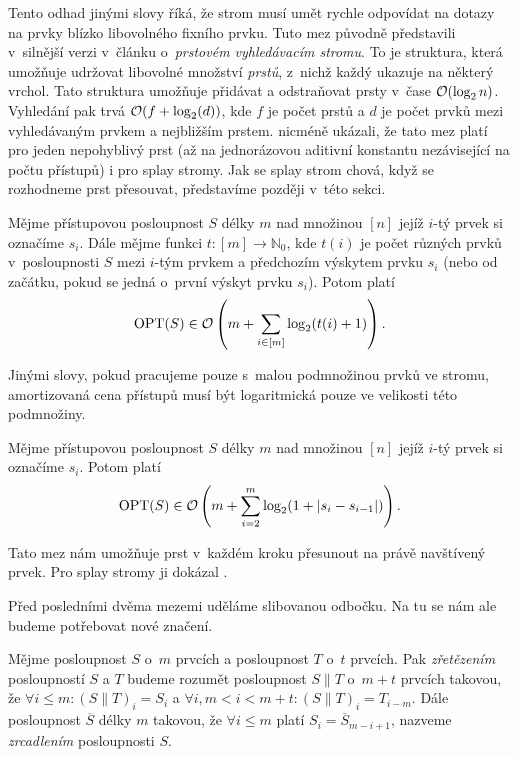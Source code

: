 Tento odhad jinými slovy říká, že strom musí umět rychle odpovídat na dotazy na
prvky blízko libovolného fixního prvku. Tuto mez původně představili v~silnější
verzi \citet{fingersearchtree} v~článku o~\emph{prstovém vyhledávacím stromu}. To je
struktura, která umožňuje udržovat libovolné množství \emph{prstů}, z~nichž každý
ukazuje na některý vrchol. Tato struktura umožňuje přidávat a odstraňovat prsty
v~čase $\o(\log n)$. Vyhledání pak trvá $\o(f+\log(d))$, kde $f$ je počet prstů
a $d$ je počet prvků mezi vyhledávaným prvkem a nejbližším prstem.
\citet{splay}  nicméně ukázali, že tato mez platí pro jeden nepohyblivý
prst (až na jednorázovou aditivní konstantu nezávisející na počtu přístupů) i
pro splay stromy. Jak se splay strom chová, když se rozhodneme prst přesouvat,
představíme později v~této sekci. 


\begin{veta}

Mějme přístupovou posloupnost $S$ délky $m$ nad množinou $[n]$ jejíž $i$-tý prvek si označíme $s_i$. Dále mějme funkci $t: [m]\rightarrow \mathbb N_0$, kde $t(i)$ je počet různých prvků v~posloupnosti $S$ mezi $i$-tým prvkem a předchozím výskytem prvku $s_i$ (nebo od začátku, pokud se jedná o~první výskyt prvku $s_i$). Potom platí $$\opt(S) \in \o\left(m + \sum_{i\in [m]}\log (t(i)+1) \right).$$
\end{veta}

Jinými slovy, pokud pracujeme pouze s~malou podmnožinou prvků ve stromu, amortizovaná cena přístupů musí být logaritmická pouze ve velikosti této podmnožiny.

\begin{veta}
Mějme přístupovou posloupnost $S$ délky $m$ nad množinou $[n]$ jejíž $i$-tý prvek si označíme $s_i$. Potom platí $$\opt(S) \in \o\left(m + \sum_{i=2}^m \log(1 + |s_{i}-s_{i-1}|) \right).$$
\end{veta}

Tato mez nám umožňuje prst v~každém kroku přesunout na právě navštívený prvek. Pro splay stromy ji dokázal \citet{dynamicfinger}.

Před posledními dvěma mezemi uděláme slibovanou odbočku. Na tu se nám ale budeme potřebovat nové značení.

\begin{definice}
Mějme posloupnost $S$ o~$m$ prvcích a posloupnost $T$ o~$t$ prvcích. Pak
\emph{zřetězením} posloupností $S$ a $T$ budeme rozumět posloupnost $S\|T$
o~$m+t$ prvcích takovou, že $\forall i\leq m: (S\|T)_i = S_i$ a $\forall i,
m<i<m+t: (S\|T)_i = T_{i-m}$. Dále posloupnost
$\overline{S}$ délky $m$ takovou, že $\forall i\leq m$ platí $S_i =
\overline{S}_{m-i+1}$, nazveme \emph{zrcadlením} posloupnosti $S$. 
\end{definice}


